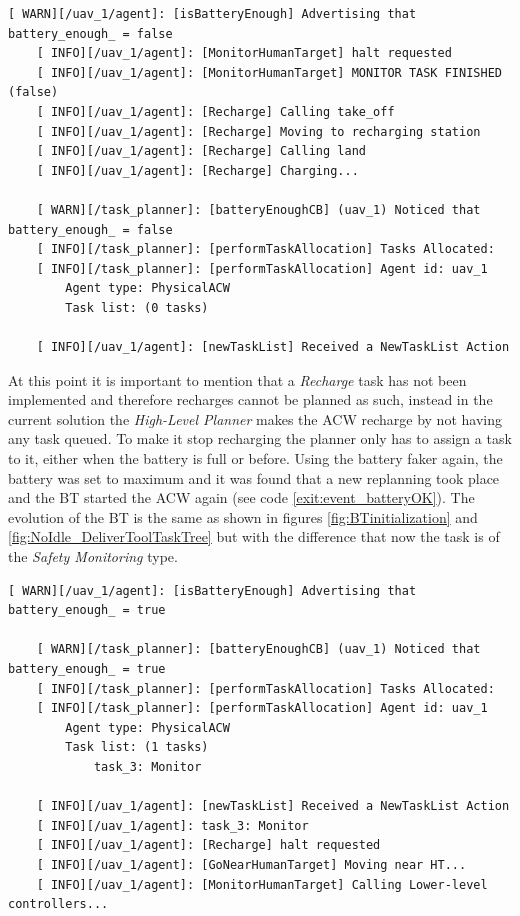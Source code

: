 \begin{lstlisting}[caption={Feedback messages printed after insufficient battery event}, breaklines=true, label=exit:event_battery]
    [ WARN][/uav_1/agent]: [isBatteryEnough] Advertising that battery_enough_ = false
    [ INFO][/uav_1/agent]: [MonitorHumanTarget] halt requested
    [ INFO][/uav_1/agent]: [MonitorHumanTarget] MONITOR TASK FINISHED (false)
    [ INFO][/uav_1/agent]: [Recharge] Calling take_off
    [ INFO][/uav_1/agent]: [Recharge] Moving to recharging station
    [ INFO][/uav_1/agent]: [Recharge] Calling land
    [ INFO][/uav_1/agent]: [Recharge] Charging...
    
    [ WARN][/task_planner]: [batteryEnoughCB] (uav_1) Noticed that battery_enough_ = false
    [ INFO][/task_planner]: [performTaskAllocation] Tasks Allocated:
    [ INFO][/task_planner]: [performTaskAllocation] Agent id: uav_1
        Agent type: PhysicalACW
        Task list: (0 tasks)
    
    [ INFO][/uav_1/agent]: [newTaskList] Received a NewTaskList Action
\end{lstlisting}

At this point it is important to mention that a \emph{Recharge} task has not been implemented and therefore recharges cannot be planned as such, instead in the current solution the \emph{High-Level Planner} makes the \gls{ACW} recharge by not having any task queued. To make it stop recharging the planner only has to assign a task to it, either when the battery is full or before. Using the battery faker again, the battery was set to maximum and it was found that a new replanning took place and the \gls{BT} started the \gls{ACW} again (see code \ref{exit:event_batteryOK}). The evolution of the \gls{BT} is the same as shown in figures \ref{fig:BTinitialization} and \ref{fig:NoIdle_DeliverToolTaskTree} but with the difference that now the task is of the \emph{Safety Monitoring} type.

\begin{lstlisting}[caption={Feedback messages printed after enough battery event}, breaklines=true, label=exit:event_batteryOK]
    [ WARN][/uav_1/agent]: [isBatteryEnough] Advertising that battery_enough_ = true

    [ WARN][/task_planner]: [batteryEnoughCB] (uav_1) Noticed that battery_enough_ = true
    [ INFO][/task_planner]: [performTaskAllocation] Tasks Allocated:
    [ INFO][/task_planner]: [performTaskAllocation] Agent id: uav_1
        Agent type: PhysicalACW
        Task list: (1 tasks)
            task_3: Monitor
    
    [ INFO][/uav_1/agent]: [newTaskList] Received a NewTaskList Action
    [ INFO][/uav_1/agent]: task_3: Monitor
    [ INFO][/uav_1/agent]: [Recharge] halt requested
    [ INFO][/uav_1/agent]: [GoNearHumanTarget] Moving near HT...
    [ INFO][/uav_1/agent]: [MonitorHumanTarget] Calling Lower-level controllers...
\end{lstlisting}

